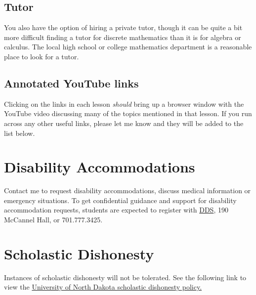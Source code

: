 \documentclass[11pt]{amsart}
\begin{document}
\subsection{Tutor}
You also have the option of hiring a private tutor, though it can be quite a bit more difficult 
finding a tutor for discrete mathematics than it is for  algebra or calculus. The local high school or college mathematics department is a reasonable place to look for a tutor.

\subsection{Annotated YouTube links}

Clicking on the links in each lesson  {\it should} bring up a browser window with the YouTube video discussing many of the topics mentioned in that lesson.
If you run across any other useful links, please let me know and they will be added to the list below.



\section{Disability Accommodations}

 Contact me to request disability accommodations, discuss medical information or emergency situations. To get confidential guidance and support for disability accommodation requests, students are expected to register with  \href{http://und.edu/disability-services} {\color{red}DDS}, 190 McCannel Hall, or 701.777.3425.
 
 \section{Scholastic  Dishonesty}
 
 Instances of scholastic dishonesty will not be tolerated. See the following link to view the 
 \href{http://und.edu/student-affairs/code-of-students-life/_files/codepdfs/appendix/iiia/iiia-3.pdf}
{\color{red}University of North Dakota scholastic dishonesty policy.}
\end{document}
